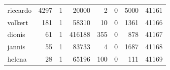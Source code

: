 \begin{tabular}{lrrrrrrr}
                              riccardo &        4297 &                       1 &        20000 &          2 &       0 &                 5000 & 41161 \\
                               volkert &         181 &                       1 &        58310 &         10 &       0 &                 1361 & 41166 \\
                                dionis &          61 &                       1 &       416188 &        355 &       0 &                  878 & 41167 \\
                                jannis &          55 &                       1 &        83733 &          4 &       0 &                 1687 & 41168 \\
                                helena &          28 &                       1 &        65196 &        100 &       0 &                  111 & 41169 \\
\bottomrule
\end{tabular}